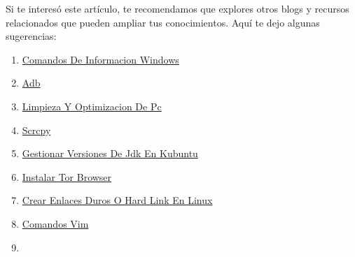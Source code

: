 \documentclass[
  doc,
  floatsintext,
  longtable,
  a4paper,
  nolmodern,
  notxfonts,
  notimes,
  12pt,
  colorlinks=true,linkcolor=blue,citecolor=blue,urlcolor=blue]{apa7}
\providecommand{\tightlist}{%
  \setlength{\itemsep}{0pt}\setlength{\parskip}{0pt}}
\begin{document}
Si te interesó este artículo, te recomendamos que explores otros blogs y
recursos relacionados que pueden ampliar tus conocimientos. Aquí te dejo
algunas sugerencias:

\begin{enumerate}
\def\labelenumi{\arabic{enumi}.}
\tightlist
\item
  \href{https://chaska-x.netlify.app/operating-system/2017-05-21-comandos-de-informacion-windows/index.pdf}{}
  \href{https://chaska-x.netlify.app/operating-system/2017-05-21-comandos-de-informacion-windows}{Comandos
  De Informacion Windows}
\item
  \href{https://chaska-x.netlify.app/operating-system/2019-06-19-adb/index.pdf}{}
  \href{https://chaska-x.netlify.app/operating-system/2019-06-19-adb}{Adb}
\item
  \href{https://chaska-x.netlify.app/operating-system/2021-08-17-limpieza-y-optimizacion-de-pc/index.pdf}{}
  \href{https://chaska-x.netlify.app/operating-system/2021-08-17-limpieza-y-optimizacion-de-pc}{Limpieza
  Y Optimizacion De Pc}
\item
  \href{https://chaska-x.netlify.app/operating-system/2021-10-21-scrcpy/index.pdf}{}
  \href{https://chaska-x.netlify.app/operating-system/2021-10-21-scrcpy}{Scrcpy}
\item
  \href{https://chaska-x.netlify.app/operating-system/2022-05-12-gestionar-versiones-de-jdk-en-kubuntu/index.pdf}{}
  \href{https://chaska-x.netlify.app/operating-system/2022-05-12-gestionar-versiones-de-jdk-en-kubuntu}{Gestionar
  Versiones De Jdk En Kubuntu}
\item
  \href{https://chaska-x.netlify.app/operating-system/2022-07-21-instalar-tor-browser/index.pdf}{}
  \href{https://chaska-x.netlify.app/operating-system/2022-07-21-instalar-tor-browser}{Instalar
  Tor Browser}
\item
  \href{https://chaska-x.netlify.app/operating-system/2022-08-14-crear-enlaces-duros-o-hard-link-en-linux/index.pdf}{}
  \href{https://chaska-x.netlify.app/operating-system/2022-08-14-crear-enlaces-duros-o-hard-link-en-linux}{Crear
  Enlaces Duros O Hard Link En Linux}
\item
  \href{https://chaska-x.netlify.app/operating-system/2022-09-27-comandos-vim/index.pdf}{}
  \href{https://chaska-x.netlify.app/operating-system/2022-09-27-comandos-vim}{Comandos
  Vim}
\item
  \href{https://chaska-x.netlify.app/operating-system/2023-02-16-guia-de-git-y-github/index.pdf}{}

\end{enumerate}
\end{document}
